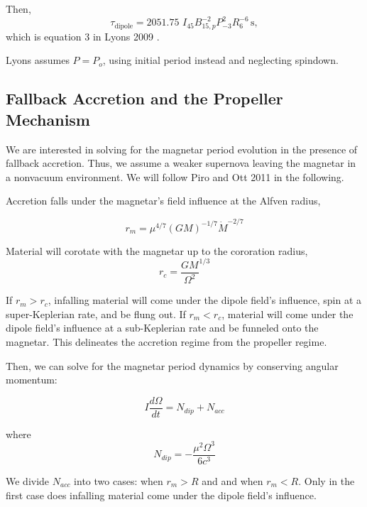 \documentclass{article}
\begin{document}
Then, \begin{equation}\tau_{\mathrm{dipole}} = 2051.75\,\, I_{45} B^{-2}_{15,p} P^2_{-3} R_6^{-6}\,\mathrm{s},\end{equation}  which is equation 3 in Lyons 2009 \cite{Lyons:2009ka}.

Lyons assumes $P=P_o$, using initial period instead and neglecting spindown.

\subsection{Fallback Accretion and the Propeller Mechanism} \label{sec:fallback}

We are interested in solving for the magnetar period evolution in the presence of fallback accretion. Thus, we assume a weaker supernova leaving the magnetar in a nonvacuum environment.  We will follow Piro and Ott 2011 \cite{Piro:2011ed} in the following. \smallskip

Accretion falls under the magnetar's field influence at the Alfven radius,

\begin{equation}
r_m=\mu^{4/7}(G M)^{-1/7} \dot{M}^{-2/7}
\end{equation}

Material will corotate with the magnetar up to the cororation radius,
\begin{equation}
r_c=\frac{GM}{\Omega^2}^{1/3}
\end{equation}

If $r_m>r_c$, infalling material will come under the dipole field's influence, spin at a super-Keplerian rate, and be flung out. If $r_m<r_c$, material will come under the dipole field's influence at a sub-Keplerian rate and be funneled onto the magnetar. This delineates the accretion regime from the propeller regime.

Then, we can solve for the magnetar period dynamics by conserving angular momentum:

\begin{equation}
I \frac{d\Omega}{dt} = N_{dip} + N_{acc}
\end{equation}

where
\begin{equation}
N_{dip}= -\frac{\mu^{2}\Omega^{3}}{6 c^{3}}
\end{equation}

We divide $N_{acc}$ into two cases: when $r_m>R$ and and when $r_m<R$. Only in the first case does infalling material come under the dipole field's influence.
\end{document}
